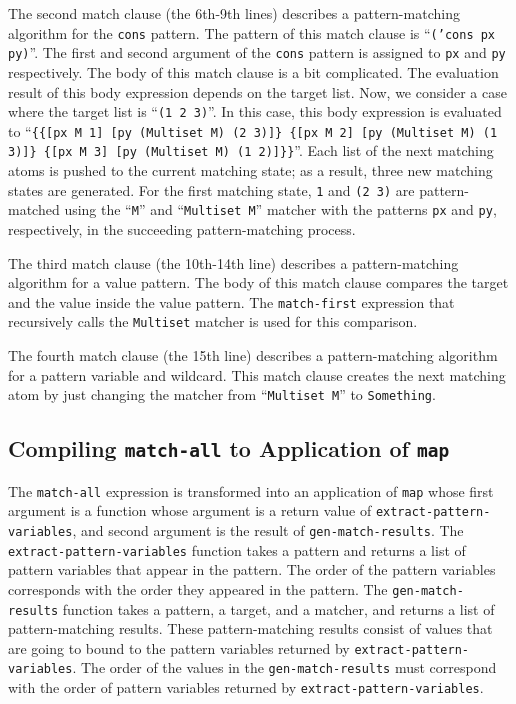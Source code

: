 \documentclass[acmlarge]{acmart}
\begin{document}
The second match clause (the 6th-9th lines) describes a pattern-matching algorithm for the \texttt{cons} pattern.
The pattern of this match clause is  ``\texttt{('cons px py)}''.
The first and second argument of the \texttt{cons} pattern is assigned to \texttt{px} and \texttt{py} respectively.
The body of this match clause is a bit complicated.
The evaluation result of this body expression depends on the target list.
Now, we consider a case where the target list is ``\texttt{(1 2 3)}''.
In this case, this body expression is evaluated to ``\texttt{\{\{[px M 1] [py (Multiset M) (2 3)]\} \{[px M 2] [py (Multiset M) (1 3)]\} \{[px M 3] [py (Multiset M) (1 2)]\}\}}''.
Each list of the next matching atoms is pushed to the current matching state; as a result, three new matching states are generated.
For the first matching state, \texttt{1} and \texttt{(2 3)} are pattern-matched using the ``\texttt{M}'' and ``\texttt{Multiset M}'' matcher with the patterns \texttt{px} and \texttt{py}, respectively, in the succeeding pattern-matching process.

The third match clause (the 10th-14th line) describes a pattern-matching algorithm for a value pattern.
The body of this match clause compares the target and the value inside the value pattern.
The \texttt{match-first} expression that recursively calls the \texttt{Multiset} matcher is used for this comparison.

The fourth match clause (the 15th line) describes a pattern-matching algorithm for a pattern variable and wildcard.
This match clause creates the next matching atom by just changing the matcher from ``\texttt{Multiset M}'' to \texttt{Something}.

\subsection{Compiling \texttt{match-all} to Application of \texttt{map}}\label{method-map}

The \texttt{match-all} expression is transformed into an application of \texttt{map} whose first argument is a function whose argument is a return value of \texttt{extract-pattern-variables}, and second argument is the result of \texttt{gen-match-results}.
The \texttt{extract-pattern-variables} function takes a pattern and returns a list of pattern variables that appear in the pattern.
The order of the pattern variables corresponds with the order they appeared in the pattern.
The \texttt{gen-match-results} function takes a pattern, a target, and a matcher, and returns a list of pattern-matching results.
These pattern-matching results consist of values that are going to bound to the pattern variables returned by \texttt{extract-pattern-variables}.
The order of the values in the \texttt{gen-match-results} must correspond with the order of pattern variables returned by \texttt{extract-pattern-variables}.
\end{document}
